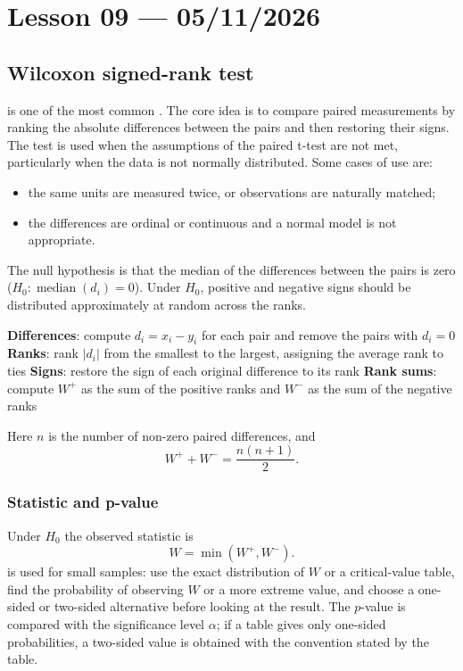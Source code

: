 \section{Lesson 09 --- 05/11/2026}

\subsection{Wilcoxon signed-rank test}

 is one of the most common . The core idea is to compare paired measurements by ranking the absolute differences between the pairs and then restoring their signs. The test is used when the assumptions of the paired t-test are not met, particularly when the data is not normally distributed. Some cases of use are:
\begin{itemize}
    \item the same units are measured twice, or observations are naturally matched;
    \item the differences are ordinal or continuous and a normal model is not appropriate.
\end{itemize}

The null hypothesis is that the median of the differences between the pairs is zero ($H_0: \operatorname{median}(d_i) = 0$). Under $H_0$, positive and negative signs should be distributed approximately at random across the ranks.

\begin{algorithm}[H]
\caption{Wilcoxon signed-rank test (statistic)}
\textbf{Differences}: compute $d_i = x_i - y_i$ for each pair and remove the pairs with $d_i = 0$\;
\textbf{Ranks}: rank $|d_i|$ from the smallest to the largest, assigning the average rank to ties\;
\textbf{Signs}: restore the sign of each original difference to its rank\;
\textbf{Rank sums}: compute $W^+$ as the sum of the positive ranks and $W^-$ as the sum of the negative ranks\;
\end{algorithm}

Here $n$ is the number of non-zero paired differences, and
\[
  W^+ + W^- = \frac{n(n+1)}{2}.
\]

\subsubsection{Statistic and p-value}

Under $H_0$ the observed statistic is
\[
  W = \min(W^+, W^-).
\]
 is used for small samples: use the exact distribution of $W$ or a critical-value table, find the probability of observing $W$ or a more extreme value, and choose a one-sided or two-sided alternative before looking at the result. The $p$-value is compared with the significance level $\alpha$; if a table gives only one-sided probabilities, a two-sided value is obtained with the convention stated by the table.

